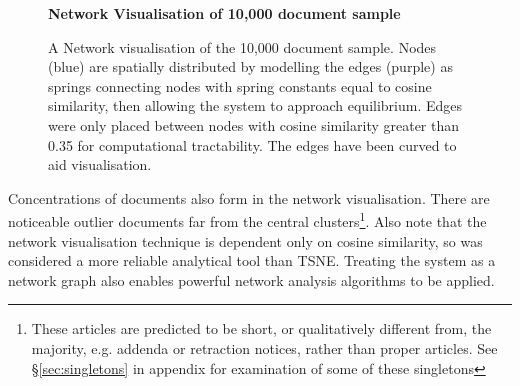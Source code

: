 \begin{center}
\begin{figure}[H]
  \centering
  \textbf{Network Visualisation of 10,000 document sample}
    \caption[Network Visualisation of 10,000 document random sample]{A Network visualisation of the 10,000 document sample. Nodes (blue) are spatially distributed by modelling the edges (purple) as springs connecting nodes with spring constants equal to cosine similarity, then allowing the system to approach equilibrium. Edges were only placed between nodes with cosine similarity greater than 0.35 for computational tractability. The edges have been curved to aid visualisation.}
    \label{fig:gephi_exp}

\end{figure} 
\end{center}
Concentrations of documents also form in the network visualisation. There are noticeable outlier documents far from the central clusters\footnote{These articles are predicted to be short, or qualitatively different from, the majority, e.g. addenda or retraction notices, rather than proper articles. See \S\ref{sec:singletons} in appendix for examination of some of these singletons}. Also note that the network visualisation technique is dependent only on cosine similarity, so was considered a more reliable analytical tool than TSNE. Treating the system as a network graph also enables powerful network analysis algorithms to be applied.